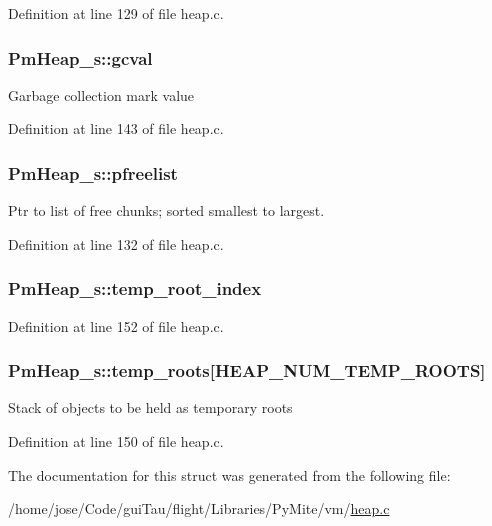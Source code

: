 Definition at line 129 of file heap.\-c.

\hypertarget{struct_pm_heap__s_a24840745d087fe4979cc7bd52481d196}{
\subsubsection[{gcval}]{ Pm\-Heap\-\_\-s\-::gcval}}\label{struct_pm_heap__s_a24840745d087fe4979cc7bd52481d196}
Garbage collection mark value 

Definition at line 143 of file heap.\-c.

\hypertarget{struct_pm_heap__s_ac40c1d519ae89ad083284a851d9bb64b}{
\subsubsection[{pfreelist}]{ Pm\-Heap\-\_\-s\-::pfreelist}}\label{struct_pm_heap__s_ac40c1d519ae89ad083284a851d9bb64b}
Ptr to list of free chunks; sorted smallest to largest. 

Definition at line 132 of file heap.\-c.

\hypertarget{struct_pm_heap__s_a47cfb967bec11fba2e6fb8405049aaad}{
\subsubsection[{temp\-\_\-root\-\_\-index}]{ Pm\-Heap\-\_\-s\-::temp\-\_\-root\-\_\-index}}\label{struct_pm_heap__s_a47cfb967bec11fba2e6fb8405049aaad}


Definition at line 152 of file heap.\-c.

\hypertarget{struct_pm_heap__s_a482ae8f2ae7c1e4644b292eec09aeb87}{
\subsubsection[{temp\-\_\-roots}]{ Pm\-Heap\-\_\-s\-::temp\-\_\-roots\mbox{[}H\-E\-A\-P\-\_\-\-N\-U\-M\-\_\-\-T\-E\-M\-P\-\_\-\-R\-O\-O\-T\-S\mbox{]}}}\label{struct_pm_heap__s_a482ae8f2ae7c1e4644b292eec09aeb87}
Stack of objects to be held as temporary roots 

Definition at line 150 of file heap.\-c.



The documentation for this struct was generated from the following file\-:\begin{DoxyCompactItemize}
\item 
/home/jose/\-Code/gui\-Tau/flight/\-Libraries/\-Py\-Mite/vm/\hyperlink{heap_8c}{heap.\-c}\end{DoxyCompactItemize}
